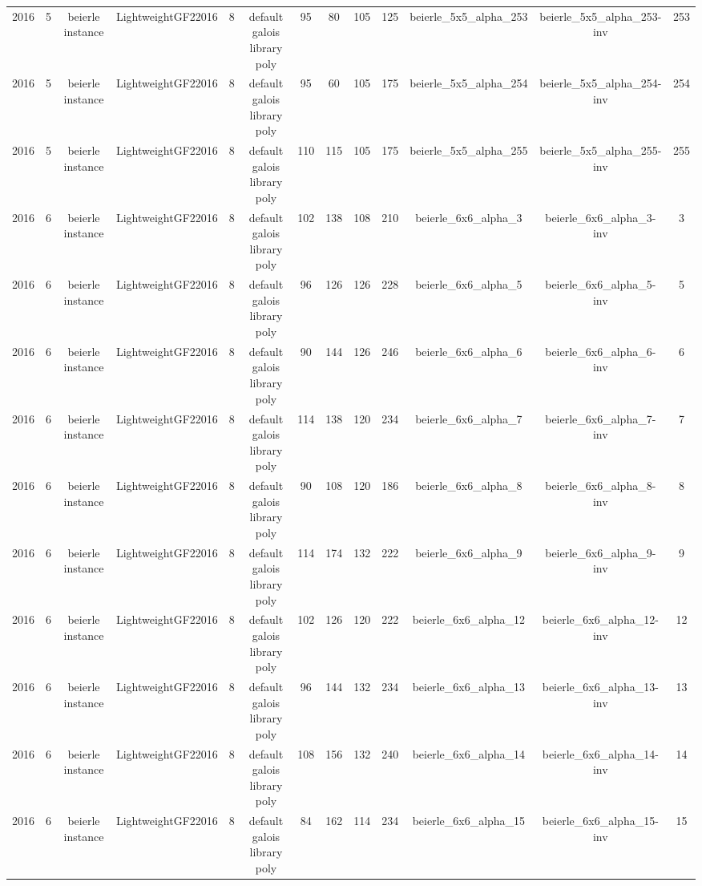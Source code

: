\begin{tabular}{c c c c c c c c c c c c c}
2016 & 5 & beierle instance & LightweightGF22016 & 8 & default galois library poly & 95 & 80 & 105 & 125 & beierle_5x5_alpha_253 & beierle_5x5_alpha_253-inv & 253 \\
2016 & 5 & beierle instance & LightweightGF22016 & 8 & default galois library poly & 95 & 60 & 105 & 175 & beierle_5x5_alpha_254 & beierle_5x5_alpha_254-inv & 254 \\
2016 & 5 & beierle instance & LightweightGF22016 & 8 & default galois library poly & 110 & 115 & 105 & 175 & beierle_5x5_alpha_255 & beierle_5x5_alpha_255-inv & 255 \\
2016 & 6 & beierle instance & LightweightGF22016 & 8 & default galois library poly & 102 & 138 & 108 & 210 & beierle_6x6_alpha_3 & beierle_6x6_alpha_3-inv & 3 \\
2016 & 6 & beierle instance & LightweightGF22016 & 8 & default galois library poly & 96 & 126 & 126 & 228 & beierle_6x6_alpha_5 & beierle_6x6_alpha_5-inv & 5 \\
2016 & 6 & beierle instance & LightweightGF22016 & 8 & default galois library poly & 90 & 144 & 126 & 246 & beierle_6x6_alpha_6 & beierle_6x6_alpha_6-inv & 6 \\
2016 & 6 & beierle instance & LightweightGF22016 & 8 & default galois library poly & 114 & 138 & 120 & 234 & beierle_6x6_alpha_7 & beierle_6x6_alpha_7-inv & 7 \\
2016 & 6 & beierle instance & LightweightGF22016 & 8 & default galois library poly & 90 & 108 & 120 & 186 & beierle_6x6_alpha_8 & beierle_6x6_alpha_8-inv & 8 \\
2016 & 6 & beierle instance & LightweightGF22016 & 8 & default galois library poly & 114 & 174 & 132 & 222 & beierle_6x6_alpha_9 & beierle_6x6_alpha_9-inv & 9 \\
2016 & 6 & beierle instance & LightweightGF22016 & 8 & default galois library poly & 102 & 126 & 120 & 222 & beierle_6x6_alpha_12 & beierle_6x6_alpha_12-inv & 12 \\
2016 & 6 & beierle instance & LightweightGF22016 & 8 & default galois library poly & 96 & 144 & 132 & 234 & beierle_6x6_alpha_13 & beierle_6x6_alpha_13-inv & 13 \\
2016 & 6 & beierle instance & LightweightGF22016 & 8 & default galois library poly & 108 & 156 & 132 & 240 & beierle_6x6_alpha_14 & beierle_6x6_alpha_14-inv & 14 \\
2016 & 6 & beierle instance & LightweightGF22016 & 8 & default galois library poly & 84 & 162 & 114 & 234 & beierle_6x6_alpha_15 & beierle_6x6_alpha_15-inv & 15 \\

\end{tabular}
